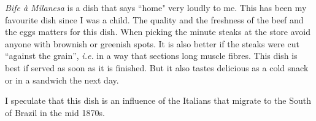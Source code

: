 \documentclass[11pt,letterpaper]{article}
\begin{document}


{\em Bife \`a Milanesa} is a dish that says ``home" very loudly to me. This has been my favourite dish since I was a child. The quality and the freshness of the beef and the eggs matters for this dish. When picking the minute steaks at the store avoid anyone with brownish or greenish spots. It is also better if the steaks were cut ``against the grain'', {\em i.e.} in a way that sections long muscle fibres. This dish is best if served as soon as it is finished. But it also tastes delicious as a cold snack or in a sandwich the next day.

I speculate that this dish is an influence of the Italians that migrate to the South of Brazil in the mid 1870s.

\vspace{.3in}
\end{document}
